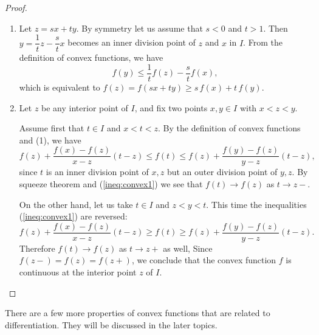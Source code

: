 \documentclass[11pt]{article}
\begin{document}
\begin{proof}
  \begin{enumerate}[$(a)$]
    \item Let $z = sx + ty$.
      By symmetry let us assume that $s < 0$ and $t > 1$.
      Then $y = \dfrac1t z - \dfrac{s}{t} x$ becomes an inner division point of $z$ and $x$ in $I$.
      From the definition of convex functions, we have
      \[
	f(y) \leqslant \frac{1}{t} f(z) - \frac{s}{t} f(x),
      \]
      which is equivalent to $f(z) = f(sx+ty) \geqslant s \, f(x) + t \, f(y)$.

    \item Let $z$ be any interior point of $I$, and fix two points $x,y \in I$ with $x < z < y$.

      Assume first that $t \in I$ and $x < t < z$.  By the definition of convex functions and (1), we have
      \begin{equation}
	\label{ineq:convex1}
	f(z) + \frac{f(x)-f(z)}{x-z} (t-z) \leqslant f(t) \leqslant
	f(z) + \frac{f(y)-f(z)}{y-z} (t-z),
      \end{equation}
      since $t$ is an inner division point of $x,z$ but an outer division point of $y,z$.  By squeeze theorem and (\ref{ineq:convex1}) we see that $f(t) \to f(z)$ as $t \to z-$.

      On the other hand, let us take $t \in I$ and $z < y < t$.
      This time the inequalities (\ref{ineq:convex1}) are reversed:
      \begin{equation}
	\label{ineq:convex2}
	f(z) + \frac{f(x)-f(z)}{x-z} (t-z) \geqslant f(t) \geqslant
	f(z) + \frac{f(y)-f(z)}{y-z} (t-z).
      \end{equation}
      Therefore $f(t) \to f(z)$ as $t \to z+$ as well,
      Since $f(z-) = f(z) = f(z+)$, we conclude that the convex function $f$ is continuous at the interior point $z$ of $I$.
  \end{enumerate}
\end{proof}

There are a few more properties of convex functions that are related to differentiation.
They will be discussed in the later topics.
\end{document}
